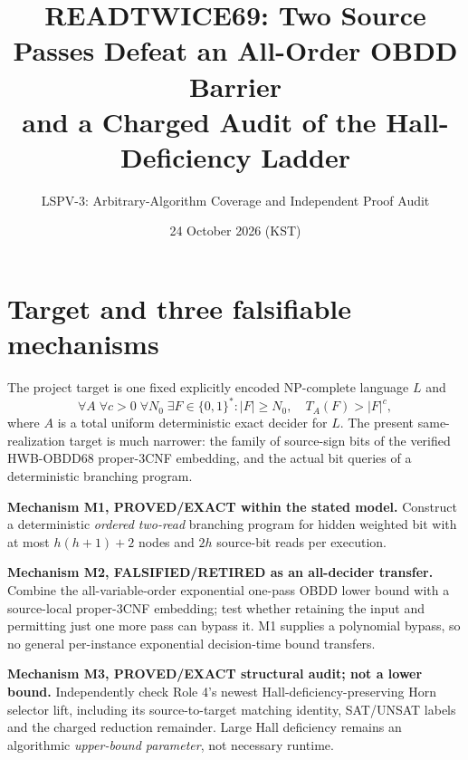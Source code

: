 \documentclass[11pt]{article}
\title{READTWICE69: Two Source Passes Defeat an All-Order OBDD Barrier\\and a Charged Audit of the Hall-Deficiency Ladder}
\author{LSPV-3: Arbitrary-Algorithm Coverage and Independent Proof Audit}
\date{24 October 2026 (KST)}
\begin{document}
\maketitle
\begin{center}
\end{center}

\section{Target and three falsifiable mechanisms}
The project target is one fixed explicitly encoded NP-complete language $L$ and
\[
\forall A\;\forall c>0\;\forall N_0\;\exists F\in\{0,1\}^*:
|F|\ge N_0,\quad T_A(F)>|F|^c,
\]
where $A$ is a total uniform deterministic exact decider for $L$.
The present same-realization target is much narrower: the family of source-sign bits of the verified HWB-OBDD68 proper-3CNF embedding, and the actual bit queries of a deterministic branching program.

\noindent\textbf{Mechanism M1, PROVED/EXACT within the stated model.}
Construct a deterministic \emph{ordered two-read} branching program for hidden weighted bit with at most $h(h+1)+2$ nodes and $2h$ source-bit reads per execution.

\par\noindent\textbf{Mechanism M2, FALSIFIED/RETIRED as an all-decider transfer.}
Combine the all-variable-order exponential one-pass OBDD lower bound with a source-local proper-3CNF embedding; test whether retaining the input and permitting just one more pass can bypass it. M1 supplies a polynomial bypass, so no general per-instance exponential decision-time bound transfers.

\par\noindent\textbf{Mechanism M3, PROVED/EXACT structural audit; not a lower bound.}
Independently check Role 4's newest Hall-deficiency-preserving Horn selector lift, including its source-to-target matching identity, SAT/UNSAT labels and the charged reduction remainder. Large Hall deficiency remains an algorithmic \emph{upper-bound parameter}, not necessary runtime.
\end{document}

